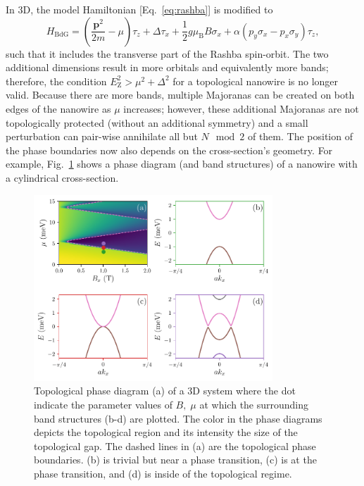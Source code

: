 In 3D, the model Hamiltonian [Eq.~\eqref{eq:rashba}] is modified to
\begin{equation}
H_{\textrm{BdG}}=\left(\frac{\bm{p}^{2}}{2m}-\mu\right)\tau_{z}+\Delta\tau_{x}+\frac{1}{2}g\mu_{\textrm{B}}B\sigma_{x}+\alpha\left(p_{y}\sigma_{x}-p_{x}\sigma_{y}\right)\tau_{z},\label{eq:3D_Ham}
\end{equation}
such that it includes the transverse part of the Rashba spin-orbit.
The two additional dimensions result in more orbitals and equivalently more bands; therefore, the condition $E_\textrm{Z}^{2}>\mu^{2}+\Delta^{2}$ for a topological nanowire is no longer valid.
Because there are more bands, multiple Majoranas can be created on both edges of the nanowire as $\mu$ increases; however, these additional Majoranas are not topologically protected (without an additional symmetry) and a small perturbation can pair-wise annihilate all but $N \mod 2$ of them.
The position of the phase boundaries now also depends on the cross-section's geometry.
For example, Fig.~\ref{fig:topo_bands} shows a phase diagram (and band structures) of a nanowire with a cylindrical cross-section.
\begin{figure}
\begin{center}
\includegraphics[width=0.8\textwidth]{chapter_introduction/figures/phase_diagram_with_bands.pdf}
\caption{Topological phase diagram (a) of a 3D system where the dot indicate the parameter values of $B,\; \mu$ at which the surrounding band structures (b-d) are plotted.
The color in the phase diagrams depicts the topological region and its intensity the size of the topological gap.
The dashed lines in (a) are the topological phase boundaries.
(b) is trivial but near a phase transition, (c) is at the phase transition, and (d) is inside of the topological regime.
\label{fig:topo_bands}}
\end{center}
\end{figure}

